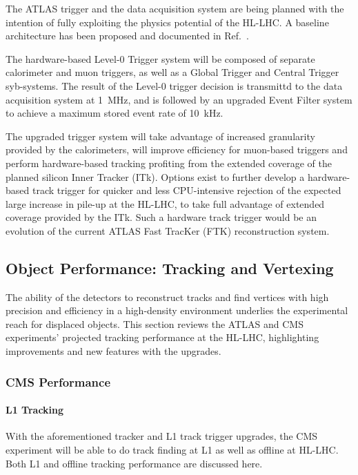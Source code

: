The ATLAS trigger and the data acquisition system are being planned with the intention of fully exploiting the physics potential of the HL-LHC. A baseline architecture has been proposed and documented in Ref.~\cite{Collaboration:2285584}. 

The hardware-based Level-0 Trigger system will be composed of separate calorimeter and muon triggers, as well as a Global Trigger and Central Trigger syb-systems.  The result of the Level-0 trigger decision is transmittd to the data acquisition system at 1~MHz, and is followed by an upgraded Event Filter system to achieve a maximum stored event rate of 10~kHz.

The upgraded trigger system will take advantage of increased granularity provided by the calorimeters, will improve efficiency for muon-based triggers and perform hardware-based tracking profiting from the extended coverage of the planned silicon Inner Tracker (ITk).  Options exist to further develop a hardware-based track trigger for quicker and less CPU-intensive rejection of the expected large increase in pile-up at the HL-LHC, to take full advantage of extended coverage provided by the ITk.  Such a hardware track trigger would be an evolution of the current ATLAS Fast TracKer (FTK) reconstruction system.

\subsection{Object Performance: Tracking and Vertexing} \label{sec:upgradeobject}

The ability of the detectors to reconstruct tracks and find vertices with high precision and efficiency in a high-density environment underlies the experimental reach for displaced objects. This section reviews the ATLAS and CMS experiments' projected tracking performance at the HL-LHC, highlighting improvements and new features with the upgrades.

\subsubsection{CMS Performance}

\paragraph{L1 Tracking}

With the aforementioned tracker and L1 track trigger upgrades, the CMS experiment will be able to do track finding at L1 as well as offline at HL-LHC. Both L1 and offline tracking performance are discussed here.


